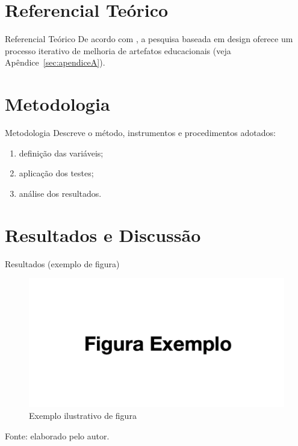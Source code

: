 \documentclass[aspectratio=169]{beamer}
\begin{document}
\section{Referencial Teórico}

\begin{frame}{Referencial Teórico}
De acordo com \parencite{pimentelDesignScienceResearch2020}, a pesquisa baseada em
design oferece um processo iterativo de melhoria de artefatos educacionais
(veja Apêndice~\ref{sec:apendiceA}).
\end{frame}

\section{Metodologia}

\begin{frame}{Metodologia}
Descreve o método, instrumentos e procedimentos adotados:

\begin{enumerate}[label=\alph*), itemsep=2pt]
  \item definição das variáveis;
  \item aplicação dos testes;
  \item análise dos resultados.
\end{enumerate}
\end{frame}

\section{Resultados e Discussão}

\begin{frame}{Resultados (exemplo de figura)}
\begin{figure}
  \includegraphics[width=0.72\linewidth]{figura.png}
  \caption{Exemplo ilustrativo de figura}
\end{figure}
{\tiny Fonte: elaborado pelo autor.}
\end{frame}
\end{document}
